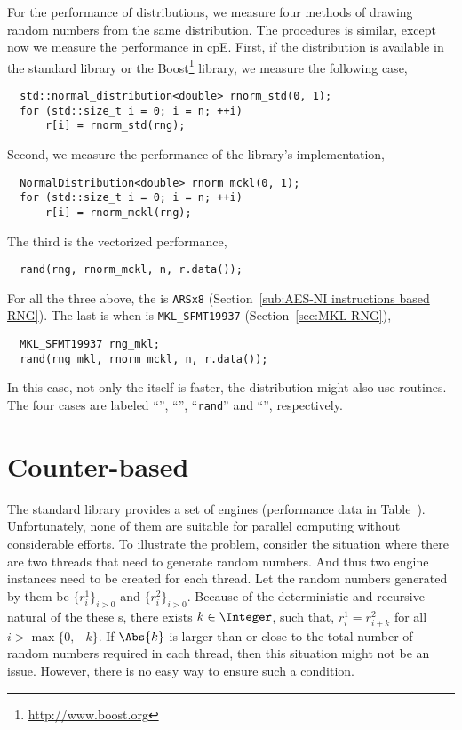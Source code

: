 For the performance of distributions, we measure four methods of drawing random
numbers from the same distribution. The procedures is similar, except now we
measure the performance in cpE. First, if the distribution is available in the
standard library or the Boost\footnote{\url{http://www.boost.org}} library, we
measure the following case,
\begin{Verbatim}
  std::normal_distribution<double> rnorm_std(0, 1);
  for (std::size_t i = 0; i = n; ++i)
      r[i] = rnorm_std(rng);
\end{Verbatim}
Second, we measure the performance of the library's implementation,
\begin{Verbatim}
  NormalDistribution<double> rnorm_mckl(0, 1);
  for (std::size_t i = 0; i = n; ++i)
      r[i] = rnorm_mckl(rng);
\end{Verbatim}
The third is the vectorized performance,
\begin{Verbatim}
  rand(rng, rnorm_mckl, n, r.data());
\end{Verbatim}
For all the three above, the \rng is \verb|ARSx8| (Section~\ref{sub:AES-NI
  instructions based RNG}). The last is when \rng is \verb|MKL_SFMT19937|
(Section~\ref{sec:MKL RNG}),
\begin{Verbatim}
  MKL_SFMT19937 rng_mkl;
  rand(rng_mkl, rnorm_mckl, n, r.data());
\end{Verbatim}
In this case, not only the \rng itself is faster, the distribution might also
use \mkl routines. The four cases are labeled ``\std'', ``\mckl'',
``\verb|rand|'' and ``\mkl'', respectively.

\section{Counter-based \protect\rng}
\label{sec:Counter-based RNG}

The standard library provides a set of \rng engines (performance data in
Table~). Unfortunately, none of
them are suitable for parallel computing without considerable efforts. To
illustrate the problem, consider the situation where there are two threads that
need to generate random numbers. And thus two \rng engine instances need to be
created for each thread. Let the random numbers generated by them be
$\{r_i^1\}_{i>0}$ and $\{r_i^2\}_{i>0}$. Because of the deterministic and
recursive natural of the these \rng{}s, there exists $k\in\Integer$, such that,
$r_i^1 = r_{i + k}^2$ for all $i > \max\{0, -k\}$. If $\Abs{k}$ is larger than
or close to the total number of random numbers required in each thread, then
this situation might not be an issue. However, there is no easy way to ensure
such a condition.

